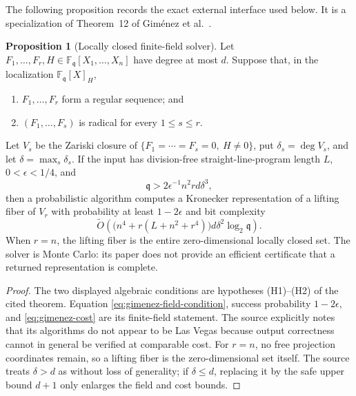 \documentclass[11pt,a4paper]{article}
\theoremstyle{definition}
\newtheorem{proposition}[theorem]{Proposition}
\theoremstyle{remark}
\newcommand{\F}{\mathbb F}
\begin{document}
The following proposition records the exact external interface used below.  It is a specialization of Theorem~12 of Gim\'enez et al.~\cite{Gimenez2026}.

\begin{proposition}[Locally closed finite-field solver]\label{prop:gimenez-theorem}
Let $F_1,\ldots,F_r,H\in\F_{\mathfrak q}[X_1,\ldots,X_n]$ have degree at most $d$.  Suppose that, in the localization $\F_{\mathfrak q}[X]_H$,
\begin{enumerate}
\item $F_1,\ldots,F_r$ form a regular sequence; and
\item $(F_1,\ldots,F_s)$ is radical for every $1\le s\le r$.
\end{enumerate}
Let $V_s$ be the Zariski closure of
$\{F_1=\cdots=F_s=0,\ H\ne0\}$, put $\delta_s=\deg V_s$, and let $\delta=\max_s\delta_s$.  If the input has division-free straight-line-program length $L$, $0<\epsilon<1/4$, and
\begin{equation}\label{eq:gimenez-field-condition}
 \mathfrak q>2\epsilon^{-1}n^2rd\delta^3,
\end{equation}
then a probabilistic algorithm computes a Kronecker representation of a lifting fiber of $V_r$ with probability at least $1-2\epsilon$ and bit complexity
\begin{equation}\label{eq:gimenez-cost}
 \widetilde O\!\left(
   \bigl(n^4+r(L+n^2+r^4)\bigr)d\delta^2\log_2\mathfrak q
 \right).
\end{equation}
When $r=n$, the lifting fiber is the entire zero-dimensional locally closed set.  The solver is Monte Carlo: its paper does not provide an efficient certificate that a returned representation is complete.
\end{proposition}

\begin{proof}
The two displayed algebraic conditions are hypotheses (H1)--(H2) of the cited theorem.  Equation \eqref{eq:gimenez-field-condition}, success probability $1-2\epsilon$, and \eqref{eq:gimenez-cost} are its finite-field statement.  The source explicitly notes that its algorithms do not appear to be Las Vegas because output correctness cannot in general be verified at comparable cost.  For $r=n$, no free projection coordinates remain, so a lifting fiber is the zero-dimensional set itself.  The source treats $\delta>d$ as without loss of generality; if $\delta\le d$, replacing it by the safe upper bound $d+1$ only enlarges the field and cost bounds.
\end{proof}
\end{document}
